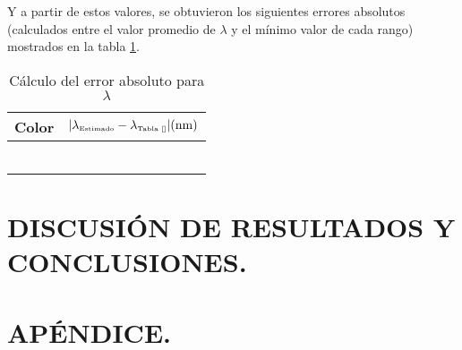 \documentclass[12pt,a4paper]{article}
\begin{document}
Y a partir de estos valores, se obtuvieron los siguientes errores absolutos (calculados entre el valor promedio de $ \lambda $ y el mínimo valor de cada rango) mostrados en la tabla \ref{tab:6.1}.
\begin{table}[!htb]
\centering
\caption{Cálculo del error absoluto para $ \lambda $}
\begin{tabular}{|l|c|}
	\hline
	Color & $ |\lambda_{\tiny\mbox{Estimado}}-\lambda_{\tiny\mbox{Tabla \ref{}}}| (\mbox{nm})$ \\
	\hline
	\cellcolor{violet!40     }{Violeta   } & \cellcolor{violet!25     }{$ 22.5644 $}  \\ \hline
	\cellcolor{blue!40       }{Azul      } & \cellcolor{blue!25       }{$ 29.5073 $}  \\ \hline
	\cellcolor{green!40!white}{Verde     } & \cellcolor{green!25!white}{$ 21.9838 $}  \\ \hline
	\cellcolor{yellow!40     }{Amarillo  } & \cellcolor{yellow!25     }{$ 52.3416 $}  \\ \hline
	\cellcolor{orange!40     }{Anaranjado} & \cellcolor{orange!25     }{$ 53.0821 $}  \\ \hline
	\cellcolor{red!40        }{Rojo      } & \cellcolor{red!25        }{$ 18.0927 $}  \\ \hline
\end{tabular}
\label{tab:6.1}
\end{table}


\section{DISCUSIÓN DE RESULTADOS Y CONCLUSIONES.} %




\section{APÉNDICE.} %
\end{document}
